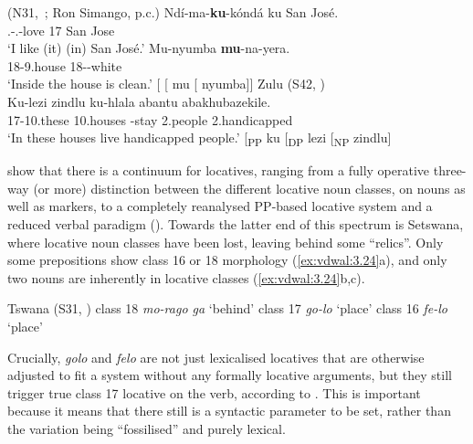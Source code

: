 \documentclass[output=paper]{langsci/langscibook}
\begin{document}
\ea\label{ex:vdwal:3.22}  (N31,~\citealt[58]{Bresnan1991}; Ron Simango, p.c.)
	\ea
	\gll	 Ndí-ma-\textbf{ku}{}-kóndá  ku  San José. \\
	    \Fsg.\Sm{}{}-\Prs{}.\Om{}-love  17  San Jose\\
	\glt    ‘I like (it) (in) San José.’%
	\ex
	\gll	 Mu-nyumba  \textbf{mu}{}-na-yera.\\
	    18-9.house  18\Sm{}-\Pst{}-white\\
	\glt    ‘Inside the house is clean.’%
    \sn {}[ [ mu [ nyumba]]
	\z
\ex\label{ex:vdwal:3.23}Zulu (S42, \citealt{Buell2007})\\
        \gll Ku-lezi  zindlu  ku-hlala  abantu  abakhubazekile. \\
         17-10.these  10.houses  \Expl-stay  2.people  2.handicapped\\
        \glt ‘In these houses live handicapped people.’
    \sn {}[\textsubscript{PP} ku\textsubscript{} [\textsubscript{DP} lezi [\textsubscript{NP} zindlu]
\z

\citet{RiedelMarten2012} show that there is a continuum for  locatives,
ranging from a fully operative three-way (or more) distinction between the
different locative noun classes, on nouns as well as  markers, to a
completely reanalysed PP-based locative system and a reduced verbal 
paradigm (\citealt{DemuthMmusi1997,Creissels2011}). Towards the latter end of
this spectrum is Setswana, where locative noun classes have been lost, leaving
behind some “relics”. Only some prepositions show class 16 or 18 morphology
(\ref{ex:vdwal:3.24}a), and only two nouns are inherently in locative classes
(\ref{ex:vdwal:3.24}b,c).

\ea\label{ex:vdwal:3.24} Tswana (S31, \citealt{Creissels2011})
    \ea class 18 \emph{mo-rago ga} ‘behind’
    \ex class 17 \emph{go-lo} ‘place’
    \ex class 16 \emph{fe-lo} ‘place’
    \z
\z

Crucially, \emph{golo} and \emph{felo} are not just lexicalised locatives that
are otherwise adjusted to fit a system without any formally locative arguments,
but they still trigger true class 17 locative  on the verb, according
to \citet{Creissels2011}. This is important because it means that there still
is a syntactic parameter to be set, rather than the variation being
“fossilised” and purely lexical.
\end{document}
